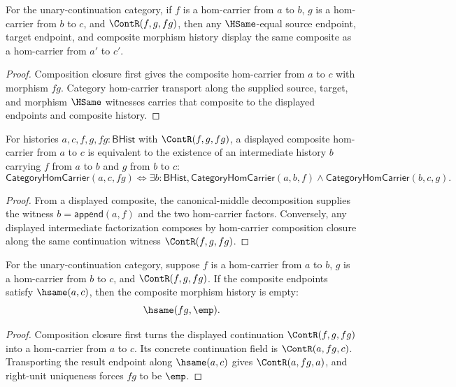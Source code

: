 \begin{theorem}
\label{thm:category-hom-carrier-comp-hsame-transport}
For the unary-continuation category, if $f$ is a hom-carrier from $a$ to $b$,
$g$ is a hom-carrier from $b$ to $c$, and $\ContR(f,g,fg)$, then any
$\HSame$-equal source endpoint, target endpoint, and composite morphism
history display the same composite as a hom-carrier from $a'$ to $c'$.
\end{theorem}
\begin{proof}
Composition closure first gives the composite hom-carrier from $a$ to $c$
with morphism $fg$. Category hom-carrier transport along the supplied source,
target, and morphism $\HSame$ witnesses carries that composite to the
displayed endpoints and composite history.
\end{proof}

\begin{theorem}
\label{thm:category-hom-carrier-comp-factorization-iff}
For histories $a,c,f,g,fg:\mathsf{BHist}$ with $\ContR(f,g,fg)$, a displayed
composite hom-carrier from $a$ to $c$ is equivalent to the existence of an
intermediate history $b$ carrying $f$ from $a$ to $b$ and $g$ from $b$ to $c$:
$$
\mathsf{CategoryHomCarrier}(a,c,fg)
\Longleftrightarrow
\exists b:\mathsf{BHist},
\mathsf{CategoryHomCarrier}(a,b,f)\wedge
\mathsf{CategoryHomCarrier}(b,c,g).
$$
\end{theorem}
\begin{proof}
From a displayed composite, the canonical-middle decomposition supplies the
witness $b=\mathsf{append}(a,f)$ and the two hom-carrier factors. Conversely,
any displayed intermediate factorization composes by hom-carrier composition
closure along the same continuation witness $\ContR(f,g,fg)$.
\end{proof}

\begin{theorem}
\label{thm:category-hom-carrier-composite-endpoint-cycle-morphism-empty}
For the unary-continuation category, suppose $f$ is a hom-carrier from $a$ to
$b$, $g$ is a hom-carrier from $b$ to $c$, and $\ContR(f,g,fg)$. If the
composite endpoints satisfy $\hsame(a,c)$, then the composite morphism history
is empty:
$$
\hsame(fg,\emp).
$$
\end{theorem}
\begin{proof}
Composition closure first turns the displayed continuation $\ContR(f,g,fg)$
into a hom-carrier from $a$ to $c$. Its concrete continuation field is
$\ContR(a,fg,c)$. Transporting the result endpoint along $\hsame(a,c)$ gives
$\ContR(a,fg,a)$, and right-unit uniqueness forces $fg$ to be $\emp$.
\end{proof}

